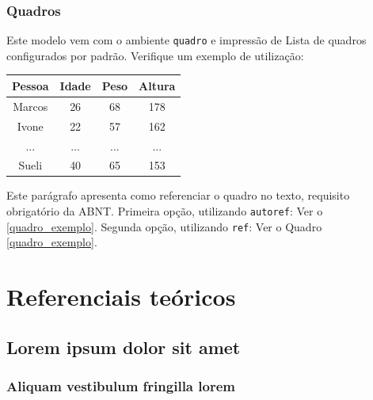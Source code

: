 \documentclass[
	12pt,				%
	openright,			%
	twoside,			%
	a4paper,			%
	english,			%
	french,				%
	spanish,			%
	brazil				%
	]{abntex2}
\begin{document}
\section{Quadros}

Este modelo vem com o ambiente \texttt{quadro} e impressão de Lista de quadros 
configurados por padrão. Verifique um exemplo de utilização:

\begin{quadro}[htb]
\caption{\label{quadro_exemplo}Exemplo de quadro}
\begin{tabular}{|c|c|c|c|}
	\hline
	\textbf{Pessoa} & \textbf{Idade} & \textbf{Peso} & \textbf{Altura} \\ \hline
	Marcos & 26    & 68   & 178    \\ \hline
	Ivone  & 22    & 57   & 162    \\ \hline
	...    & ...   & ...  & ...    \\ \hline
	Sueli  & 40    & 65   & 153    \\ \hline
\end{tabular}
\end{quadro}

Este parágrafo apresenta como referenciar o quadro no texto, requisito
obrigatório da ABNT. 
Primeira opção, utilizando \texttt{autoref}: Ver o \autoref{quadro_exemplo}. 
Segunda opção, utilizando  \texttt{ref}: Ver o Quadro \ref{quadro_exemplo}.

\part{Referenciais teóricos}

\chapter{Lorem ipsum dolor sit amet}

\section{Aliquam vestibulum fringilla lorem}

\lipsum[1]

\lipsum[2-3]

\end{document}
